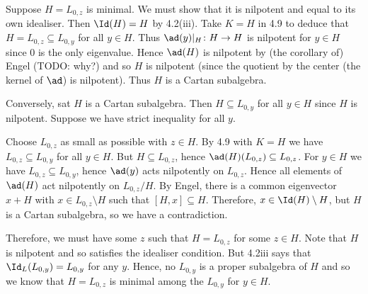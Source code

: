 Suppose $H = L_{0, z}$ is minimal. We must show that it is nilpotent and
equal to its own idealiser. Then $\Id(H) = H$ by 4.2(iii).
Take $K = H$ in 4.9 to deduce that $H = L_{0, z} \subseteq L_{0, y}$ for all
$y \in H$. Thus $\ad(y)|_H\colon H\to H$ is nilpotent for $y \in H$ since
$0$ is the only eigenvalue. Hence $\ad(H)$ is nilpotent by (the corollary of)
Engel (TODO: why?) and so $H$ is nilpotent (since the quotient by the center (the
kernel of $\ad$) is nilpotent). Thus $H$ is a Cartan subalgebra.

Conversely, sat $H$ is a Cartan subalgebra. Then $H \subseteq L_{0, y}$ for all
$y \in H$ since $H$ is nilpotent. Suppose we have strict inequality for
all $y$.

Choose $L_{0, z}$ as small as possible with $z \in H$. By 4.9 with $K = H$ we
have $L_{0, z} \subseteq L_{0, y}$ for all $y \in H$. But $H \subseteq L_{0, z}$,
hence $\ad(H)(L_{0, z}) \subseteq L_{0, z}$. For $y \in H$ we have
$L_{0, z} \subseteq L_{0, y}$, hence $\ad(y)$ acts nilpotently on $L_{0, z}$.
Hence all elements of $\ad(H)$ act nilpotently on $L_{0, z}/H$. By Engel,
there is a common eigenvector $x+H$ with $x \in L_{0, z}\setminus H$ such that
$[H, x] \subseteq H$. Therefore, $x \in \Id(H) \setminus H$, but $H$ is a Cartan
subalgebra, so we have a contradiction.

Therefore, we must have some $z$ such that $H = L_{0, z}$ for some $z \in H$. Note
that $H$ is nilpotent and so satisfies the idealiser condition. But 4.2iii says
that $\Id_L(L_{0, y}) = L_{0, y}$ for any $y$. Hence, no $L_{0, y}$ is a proper
subalgebra of $H$ and so we know that $H = L_{0, z}$ is minimal among the
$L_{0, y}$ for $y \in H$.
